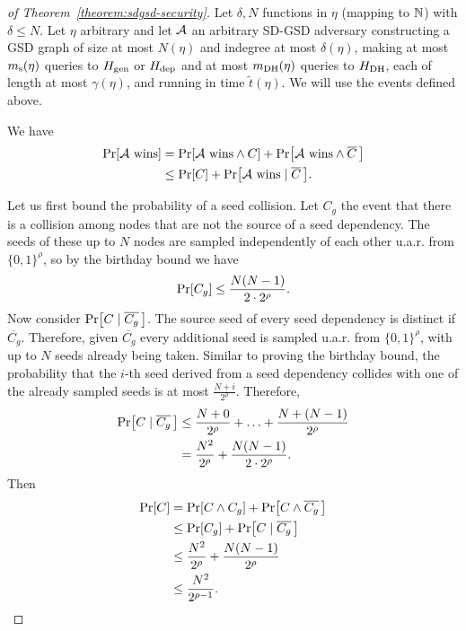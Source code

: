 \begin{proof}[of Theorem~\ref{theorem:sdgsd-security}]
	Let $\delta, N$ functions in $\eta$ (mapping to $\mathbb{N}$) with $\delta \le N$.
	Let $\eta$ arbitrary and let $\mathcal{A}$ an arbitrary SD-GSD adversary constructing a GSD graph of size at most $N(\eta)$ and indegree at most $\delta(\eta)$, making at most $m_\mathrm{s}(\eta)$ queries to $H_\mathrm{gen}$ or $H_\mathrm{dep}$ and at most $m_\mathrm{DH}(\eta)$ queries to $H_\mathrm{DH}$, each of length at most $\gamma(\eta)$, and running in time $\tilde{t}(\eta)$. We will use the events defined above.

	We have
	\begin{align} \label{eq:no-collisions}
		\begin{split}
			\pr{\wins} & = \pr{\wins \land C} + \pr{\wins \land \overline{C} \,} \\
			& \le \pr{C} + \pr{\wins \mid \overline{C} \,}.
		\end{split}
	\end{align}

	Let us first bound the probability of a seed collision. Let $C_g$ the event that there is a collision among nodes that are not the source of a seed dependency. The seeds of these up to $N$ nodes are sampled independently of each other u.a.r. from $\{0, 1\}^\rho$, so by the birthday bound we have
	\[
		\pr{C_g} \le \frac{N(N - 1)}{2 \cdot 2^\rho}.
	\]
	Now consider $\pr{C \mid \overline{C_g} \,}$. The source seed of every seed dependency is distinct if $\overline{C_g}$. Therefore, given $\overline{C_g}$ every additional seed is sampled u.a.r. from $\{0, 1\}^\rho$, with up to $N$ seeds already being taken. Similar to proving the birthday bound, the probability that the $i$-th seed derived from a seed dependency collides with one of the already sampled seeds is at most $\frac{N + i}{2^\rho}$. Therefore,
	\begin{align*}
		\pr{C \mid \overline{C_g} \,} & \le \frac{N + 0}{2^\rho} + \ldots + \frac{N + (N - 1)}{2^\rho} \\
		                              & = \frac{N^2}{2^\rho} + \frac{N(N - 1)}{2 \cdot 2^\rho}.
	\end{align*}
	Then
	\begin{align} \label{eq:bound-collision}
		\begin{split}
			\pr{C} & = \pr{C \land C_g} + \pr{C \land \overline{C_g} \,} \\
			& \le \pr{C_g} + \pr{C \mid \overline{C_g} \,}        \\
			& \le \frac{N^2}{2^\rho} + \frac{N(N - 1)}{2^\rho}    \\
			& \le \frac{N^2}{2^{\rho - 1}}.
		\end{split}
	\end{align}


\end{proof}
